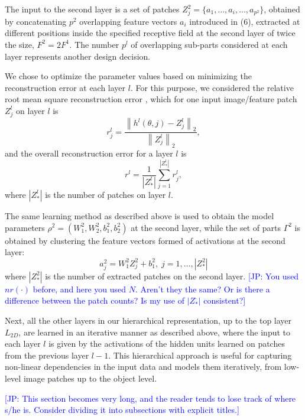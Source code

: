\documentclass[runningheads]{llncs}
\newcommand{\commentJP}[1]{\textcolor{blue}{[JP: #1]}}
\begin{document}
The input to the second layer is a set of patches $Z_j^2=\{a_1,\ldots,a_i,\ldots,a_{p^2}\}$, obtained by concatenating  $p^2$ overlapping feature vectors $a_i$ introduced in (6), extracted at different positions inside the specified receptive field at the second layer of twice the size, $F^2=2F^1$. The number $p^l$ of overlapping sub-parts considered at each layer represents another design decision.

We chose to optimize the parameter values based on minimizing the reconstruction error at each layer $l$. For this purpose, we considered the relative root mean square reconstruction error \cite{Chai2014}, which for one input image/feature patch $Z_j^l$ on layer $l$ is
\begin{equation}
 r_j^l = \frac{\left\|h^l(\theta,j)-Z_j^l\right\|_2}{\left\|Z_j^l\right\|_2},
\end{equation}
and the overall reconstruction error for a layer $l$ is
\begin{equation}
  r^l = \frac{1}{|Z_*^l|} \sum_{j=1}^{|Z_*^l|} r_j^l,
  \label{eq:r}
\end{equation}
where $|Z_*^l|$ is the number of patches on layer $l$.

The same learning method as described above is used to obtain the model parameters $\rho^2=(W_1^2,W_2^2,b_1^2,b_2^2)$ at the second layer, while the set of parts $\Gamma^{2}$ is obtained by clustering the feature vectors formed of activations at the second layer:
\begin{equation}
a_j^2=W_1^2Z_j^2+b_1^2, \;j=1,\ldots,|Z_*^2|
\end{equation}
where $|Z_*^2|$ is the number of extracted patches on the second layer.
\commentJP{You used $nr(\cdot)$ before, and here you used $N$.  Aren't they the same? Or is there a difference between the patch counts? Is my use of $|Z_*^{\cdot}|$ consistent?}

Next, all the other layers in our hierarchical representation, up to the top layer $L_{2D}$, are learned in an iterative manner as described above, where the input to each layer $l$ is given by the activations of the hidden units learned on patches from the previous layer $l-1$. This hierarchical approach is useful for capturing non-linear dependencies in the input data and models them iteratively, from low-level image patches up to the object level.

\commentJP{This section becomes very long, and the reader tends to lose track of where s/he is.  Consider dividing it into subsections with explicit titles.}
\end{document}
